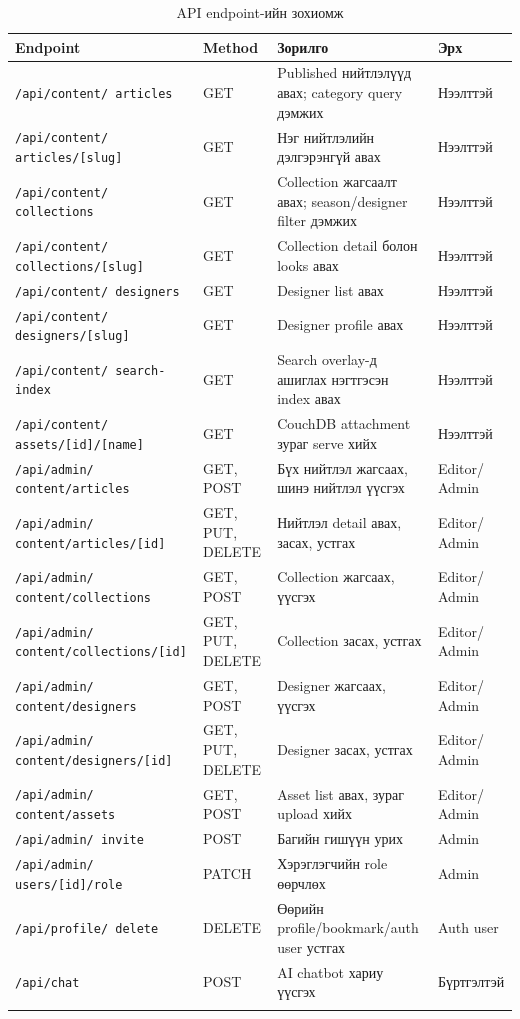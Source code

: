 {\small
\begin{longtable}{|L{0.26\textwidth}|L{0.14\textwidth}|L{0.28\textwidth}|L{0.14\textwidth}|}
  \hline
  \textbf{Endpoint} & \textbf{Method} & \textbf{Зорилго} & \textbf{Эрх} \\ \hline
  \texttt{/api/content/ articles} & GET & Published нийтлэлүүд авах; category query дэмжих & Нээлттэй \\ \hline
  \texttt{/api/content/ articles/[slug]} & GET & Нэг нийтлэлийн дэлгэрэнгүй авах & Нээлттэй \\ \hline
  \texttt{/api/content/ collections} & GET & Collection жагсаалт авах; season/designer filter дэмжих & Нээлттэй \\ \hline
  \texttt{/api/content/ collections/[slug]} & GET & Collection detail болон looks авах & Нээлттэй \\ \hline
  \texttt{/api/content/ designers} & GET & Designer list авах & Нээлттэй \\ \hline
  \texttt{/api/content/ designers/[slug]} & GET & Designer profile авах & Нээлттэй \\ \hline
  \texttt{/api/content/ search-index} & GET & Search overlay-д ашиглах нэгтгэсэн index авах & Нээлттэй \\ \hline
  \texttt{/api/content/ assets/[id]/[name]} & GET & CouchDB attachment зураг serve хийх & Нээлттэй \\ \hline
  \texttt{/api/admin/ content/articles} & GET, POST & Бүх нийтлэл жагсаах, шинэ нийтлэл үүсгэх & Editor/ Admin \\ \hline
  \texttt{/api/admin/ content/articles/[id]} & GET, PUT, DELETE & Нийтлэл detail авах, засах, устгах & Editor/ Admin \\ \hline
  \texttt{/api/admin/ content/collections} & GET, POST & Collection жагсаах, үүсгэх & Editor/ Admin \\ \hline
  \texttt{/api/admin/ content/collections/[id]} & GET, PUT, DELETE & Collection засах, устгах & Editor/ Admin \\ \hline
  \texttt{/api/admin/ content/designers} & GET, POST & Designer жагсаах, үүсгэх & Editor/ Admin \\ \hline
  \texttt{/api/admin/ content/designers/[id]} & GET, PUT, DELETE & Designer засах, устгах & Editor/ Admin \\ \hline
  \texttt{/api/admin/ content/assets} & GET, POST & Asset list авах, зураг upload хийх & Editor/ Admin \\ \hline
  \texttt{/api/admin/ invite} & POST & Багийн гишүүн урих & Admin \\ \hline
  \texttt{/api/admin/ users/[id]/role} & PATCH & Хэрэглэгчийн role өөрчлөх & Admin \\ \hline
  \texttt{/api/profile/ delete} & DELETE & Өөрийн profile/bookmark/auth user устгах & Auth user \\ \hline
  \texttt{/api/chat} & POST & AI chatbot хариу үүсгэх & Бүртгэлтэй \\ \hline
  \caption{API endpoint-ийн зохиомж}
  \label{tab:ch3-api-design}\\
\end{longtable}
}


